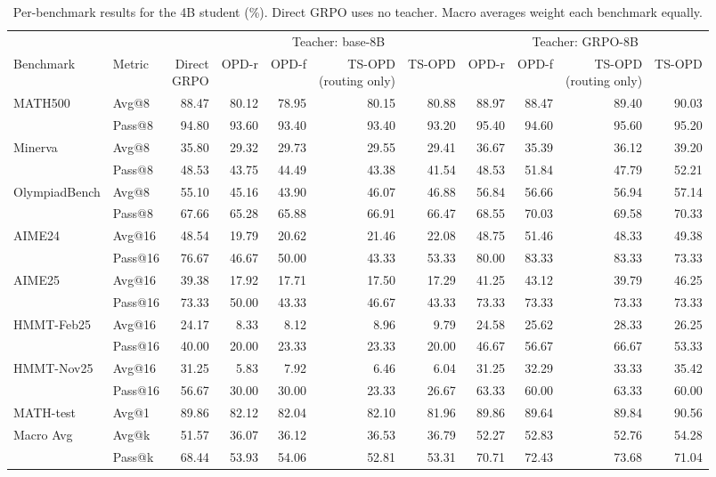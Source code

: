 \documentclass[10pt]{article}
\begin{document}
\begin{table}[h]
\centering
\scriptsize
\setlength{\tabcolsep}{3.5pt}
\caption{Per-benchmark results for the 4B student (\%). Direct GRPO uses no teacher. Macro averages weight each benchmark equally.}
\label{tab:app-full-4B}
\begin{tabular}{llrrrrrrrrr}
\toprule
 & & & \multicolumn{4}{c}{Teacher: base-8B} & \multicolumn{4}{c}{Teacher: GRPO-8B} \\
\cmidrule(lr){4-7}\cmidrule(lr){8-11}
Benchmark & Metric & \shortstack{Direct\\GRPO} & OPD-r & OPD-f & \shortstack{TS-OPD\\(routing only)} & TS-OPD & OPD-r & OPD-f & \shortstack{TS-OPD\\(routing only)} & TS-OPD \\
\midrule
MATH500 & Avg@8 & 88.47 & 80.12 & 78.95 & 80.15 & 80.88 & 88.97 & 88.47 & 89.40 & 90.03 \\
 & Pass@8 & 94.80 & 93.60 & 93.40 & 93.40 & 93.20 & 95.40 & 94.60 & 95.60 & 95.20 \\
Minerva & Avg@8 & 35.80 & 29.32 & 29.73 & 29.55 & 29.41 & 36.67 & 35.39 & 36.12 & 39.20 \\
 & Pass@8 & 48.53 & 43.75 & 44.49 & 43.38 & 41.54 & 48.53 & 51.84 & 47.79 & 52.21 \\
OlympiadBench & Avg@8 & 55.10 & 45.16 & 43.90 & 46.07 & 46.88 & 56.84 & 56.66 & 56.94 & 57.14 \\
 & Pass@8 & 67.66 & 65.28 & 65.88 & 66.91 & 66.47 & 68.55 & 70.03 & 69.58 & 70.33 \\
AIME24 & Avg@16 & 48.54 & 19.79 & 20.62 & 21.46 & 22.08 & 48.75 & 51.46 & 48.33 & 49.38 \\
 & Pass@16 & 76.67 & 46.67 & 50.00 & 43.33 & 53.33 & 80.00 & 83.33 & 83.33 & 73.33 \\
AIME25 & Avg@16 & 39.38 & 17.92 & 17.71 & 17.50 & 17.29 & 41.25 & 43.12 & 39.79 & 46.25 \\
 & Pass@16 & 73.33 & 50.00 & 43.33 & 46.67 & 43.33 & 73.33 & 73.33 & 73.33 & 73.33 \\
HMMT-Feb25 & Avg@16 & 24.17 & 8.33 & 8.12 & 8.96 & 9.79 & 24.58 & 25.62 & 28.33 & 26.25 \\
 & Pass@16 & 40.00 & 20.00 & 23.33 & 23.33 & 20.00 & 46.67 & 56.67 & 66.67 & 53.33 \\
HMMT-Nov25 & Avg@16 & 31.25 & 5.83 & 7.92 & 6.46 & 6.04 & 31.25 & 32.29 & 33.33 & 35.42 \\
 & Pass@16 & 56.67 & 30.00 & 30.00 & 23.33 & 26.67 & 63.33 & 60.00 & 63.33 & 60.00 \\
MATH-test & Avg@1 & 89.86 & 82.12 & 82.04 & 82.10 & 81.96 & 89.86 & 89.64 & 89.84 & 90.56 \\
\midrule
Macro Avg & Avg@k & 51.57 & 36.07 & 36.12 & 36.53 & 36.79 & 52.27 & 52.83 & 52.76 & 54.28 \\
 & Pass@k & 68.44 & 53.93 & 54.06 & 52.81 & 53.31 & 70.71 & 72.43 & 73.68 & 71.04 \\
\bottomrule
\end{tabular}
\end{table}
\end{document}
